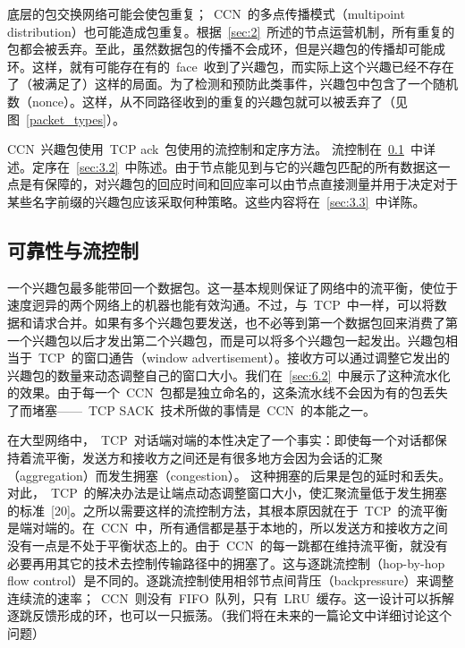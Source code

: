 底层的包交换网络可能会使包重复；~CCN~的多点传播模式（multipoint distribution）也可能造成包重复。根据~\ref{sec:2}~所述的节点运营机制，所有重复的包都会被丢弃。至此，虽然数据包的传播不会成环，但是兴趣包的传播却可能成环。这样，就有可能存在有的~face~收到了兴趣包，而实际上这个兴趣已经不存在了（被满足了）这样的局面。为了检测和预防此类事件，兴趣包中包含了一个随机数（nonce）。这样，从不同路径收到的重复的兴趣包就可以被丢弃了（见图~\ref{packet_types}）。

CCN~兴趣包使用~TCP ack~包使用的流控制和定序方法。%
流控制在~\ref{sec:3.1}~中详述。定序在~\ref{sec:3.2}~中陈述。由于节点能见到与它的兴趣包匹配的所有数据这一点是有保障的，对兴趣包的回应时间和回应率可以由节点直接测量并用于决定对于某些名字前缀的兴趣包应该采取何种策略。这些内容将在~\ref{sec:3.3}~中详陈。

\subsection{可靠性与流控制}
\label{sec:3.1}
一个兴趣包最多能带回一个数据包。这一基本规则保证了网络中的流平衡，使位于速度迥异的两个网络上的机器也能有效沟通。不过，与~TCP~中一样，可以将数据和请求合并。如果有多个兴趣包要发送，也不必等到第一个数据包回来消费了第一个兴趣包以后才发出第二个兴趣包，而是可以将多个兴趣包一起发出。兴趣包相当于~TCP~的窗口通告（window advertisement）。接收方可以通过调整它发出的兴趣包的数量来动态调整自己的窗口大小。我们在~\ref{sec:6.2}~中展示了这种流水化的效果。由于每一个~CCN~包都是独立命名的，这条流水线不会因为有的包丢失了而堵塞——~TCP SACK~技术所做的事情是~CCN~的本能之一。

在大型网络中，~TCP~对话端对端的本性决定了一个事实：即使每一个对话都保持着流平衡，发送方和接收方之间还是有很多地方会因为会话的汇聚（aggregation）而发生拥塞（congestion）。%
这种拥塞的后果是包的延时和丢失。对此，~TCP~的解决办法是让端点动态调整窗口大小，使汇聚流量低于发生拥塞的标准~[20]。之所以需要这样的流控制方法，其根本原因就在于~TCP~的流平衡是端对端的。在~CCN~中，所有通信都是基于本地的，所以发送方和接收方之间没有一点是不处于平衡状态上的。由于~CCN~的每一跳都在维持流平衡，就没有必要再用其它的技术去控制传输路径中的拥塞了。这与逐跳流控制（hop-by-hop flow control）是不同的。逐跳流控制使用相邻节点间背压（backpressure）来调整连续流的速率；~CCN~则没有~FIFO~队列，只有~LRU~缓存。这一设计可以拆解逐跳反馈形成的环，也可以一只振荡。（我们将在未来的一篇论文中详细讨论这个问题）

